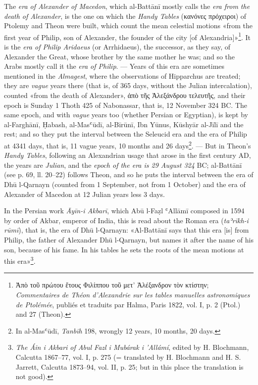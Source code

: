 \documentclass[11pt]{article}
\newcommand{\Pg}[1]{\marginpar{\footnotesize\color{gray}#1}}
\begin{document}
\par \Pg{I 243}The \emph{era of Alexander of Macedon}, which al-Battānī mostly calls the \emph{era from the death of Alexander}, is the one on which the \emph{Handy Tables} ({\greekfont κανόνες πρόχειροι}) of Ptolemy and Theon were built, which count the mean celestial motions «from the first year of Philip, son of Alexander, the founder of the city [of Alexandria]»\footnote{{\greekfont Ἀπὸ τοῦ πρώτου ἔτους Φιλίππου τοῦ μετ’ Ἀλέξανδρον τὸν κτίστην}; \emph{Commentaires de Théon d’Alexandrie sur les tables manuelles astronomiques de Ptolémée}, publiés et traduits par Halma, Paris 1822, vol. I, p. 2 (Ptol.) and 27 (Theon).}. It is the \emph{era of Philip Aridaeus} (or Arrhidaeus), the successor, as they say, of Alexander the Great, whose brother by the same mother he was; and so the Arabs mostly call it the \emph{era of Philip}. — Years of this era are sometimes mentioned in the \emph{Almagest}, where the observations of Hipparchus are treated; they are \emph{vague} years there (that is, of 365 days, without the Julian intercalation), counted «from the death of Alexander», {\greekfont ἀπὸ τῆς Ἀλεξάνδρου τελευτῆς}, and their epoch is Sunday 1 Thoth 425 of Nabonassar, that is, 12 November 324 BC. The same epoch, and with \emph{vague} years too (whether Persian or Egyptian), is kept by al-Farghānī, Ḥabash, al-Masʿūdī, al-Bīrūnī, Ibn Yūnus, Kūshyār al-Jīlī and the rest; and so they put the interval between the Seleucid era and the era of Philip at 4341 days, that is, 11 vague years, 10 months and 26 days\footnote{In al-Masʿūdī, \emph{Tanbīh} 198, wrongly 12 years, 10 months, 20 days.}. — But in Theon's \emph{Handy Tables}, following an Alexandrian usage that arose in the first century AD, the years are \emph{Julian}, and the \emph{epoch of the era is 29 August 324} BC; al-Battānī (see p. 69, ll. 20–22) follows Theon, and so he puts the interval between the era of Dhū l-Qarnayn (counted from 1 September, not from 1 October) and the era of Alexander of Macedon at 12 Julian years less 3 days.\par
\par In the Persian work \emph{Āyīn-i Akbarī}, which Abū l-Faẓl ʿAllāmī composed in 1594 by order of Akbar, emperor of India, this is read about the Roman era (\emph{taʾrīkh-i rūmī}), that is, the era of Dhū l-Qarnayn: «Al-Battānī says that this era [is] from Philip, the father of Alexander Dhū l-Qarnayn, but names it after the name of his son, because of his fame. In his tables he sets the roots of the mean motions at this era»\footnote{\emph{The Áin i Akbari of Abul Fazl i Mubárak i ’Allámí}, edited by H. Blochmann, Calcutta 1867–77, vol. I, p. 275 (= translated by H. Blochmann and H. S. Jarrett, Calcutta 1873–94, vol. II, p. 25; but in this place the translation is not good).}.\par
\end{document}
